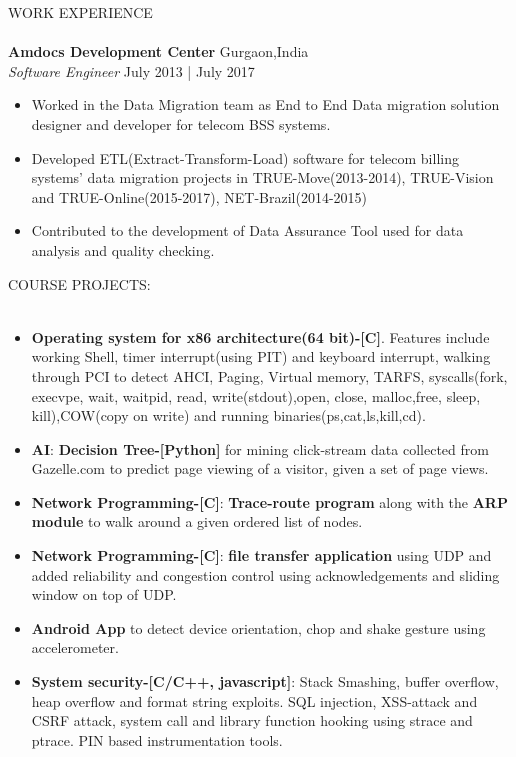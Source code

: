 \documentclass[a4paper]{article}
\newcommand{\lineunder} {
    \vspace*{-8pt} \\
    \hspace*{-18pt} \hrulefill \\
}
\newcommand{\header} [1] {
    {\hspace*{-18pt}\vspace*{6pt} \textsc{#1}}
    \vspace*{-6pt} \lineunder
}
\begin{document}
\header{WORK EXPERIENCE}

\textbf{Amdocs Development Center} \hfill Gurgaon,India\\
\textit{Software Engineer} \hfill July 2013 | July 2017\\
\begin{itemize}
\itemsep0em 
  \item Worked in the Data Migration team as End to End Data migration solution designer and developer for telecom BSS systems.
  \item Developed ETL(Extract-Transform-Load) software for telecom billing systems' data migration projects in TRUE-Move(2013-2014), TRUE-Vision and TRUE-Online(2015-2017), NET-Brazil(2014-2015)
  \item Contributed to the development of Data Assurance Tool used for data analysis and quality checking.
\end{itemize}
\header{COURSE PROJECTS:}
\begin{itemize}
\itemsep0em 
	\item \textbf{Operating system for x86 architecture(64 bit)-[C]}. Features include working Shell, timer interrupt(using PIT) and keyboard interrupt, walking through PCI to detect AHCI, Paging, Virtual memory, TARFS, syscalls(fork, execvpe, wait, waitpid, read, write(stdout),open, close, malloc,free, sleep, kill),COW(copy on write) and running binaries(ps,cat,ls,kill,cd).\\
    \item \textbf{AI}: \textbf{Decision Tree-[Python]} for mining click-stream data collected from Gazelle.com to predict page viewing of a visitor, given a set of page views.\\
    \item \textbf{Network Programming-[C]}: \textbf{Trace-route program} along with the \textbf{ARP module} to walk around a given ordered list of nodes.\\
    \item \textbf{Network Programming-[C]}: \textbf{file transfer application} using UDP and added reliability and congestion control using acknowledgements and sliding window on top of UDP.\\
    \item \textbf{Android App} to detect device orientation, chop and shake gesture using accelerometer.\\
    \item \textbf{System security-[C/C++, javascript]}: Stack Smashing, buffer overflow, heap overflow and format string exploits. SQL injection, XSS-attack and CSRF attack, system call and library function hooking using strace and ptrace. PIN based instrumentation tools.
\end{itemize}
\end{document}
